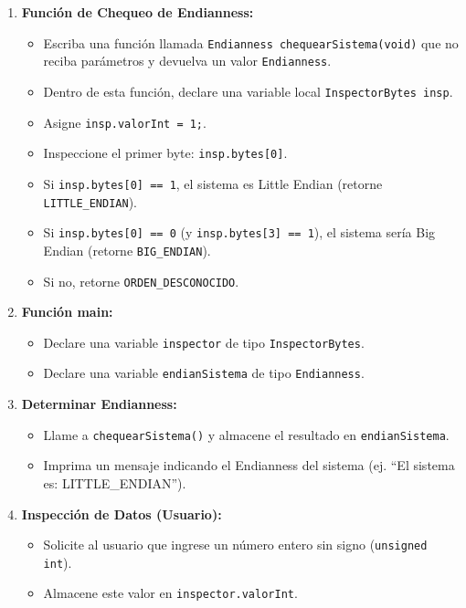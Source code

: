 \begin{enumerate}
    \item \textbf{Función de Chequeo de Endianness:}
    \begin{itemize}
        \item Escriba una función llamada \texttt{Endianness chequearSistema(void)} que no reciba parámetros y devuelva un valor \texttt{Endianness}.
        \item Dentro de esta función, declare una variable local \texttt{InspectorBytes insp}.
        \item Asigne \texttt{insp.valorInt = 1;}.
        \item Inspeccione el primer byte: \texttt{insp.bytes[0]}.
        \item Si \texttt{insp.bytes[0] == 1}, el sistema es Little Endian (retorne \texttt{LITTLE\_ENDIAN}).
        \item Si \texttt{insp.bytes[0] == 0} (y \texttt{insp.bytes[3] == 1}), el sistema sería Big Endian (retorne \texttt{BIG\_ENDIAN}).
        \item Si no, retorne \texttt{ORDEN\_DESCONOCIDO}.
    \end{itemize}

    \item \textbf{Función main:}
    \begin{itemize}
        \item Declare una variable \texttt{inspector} de tipo \texttt{InspectorBytes}.
        \item Declare una variable \texttt{endianSistema} de tipo \texttt{Endianness}.
    \end{itemize}

    \item \textbf{Determinar Endianness:}
    \begin{itemize}
        \item Llame a \texttt{chequearSistema()} y almacene el resultado en \texttt{endianSistema}.
        \item Imprima un mensaje indicando el Endianness del sistema (ej. ``El sistema es: LITTLE\_ENDIAN'').
    \end{itemize}

    \item \textbf{Inspección de Datos (Usuario):}
    \begin{itemize}
        \item Solicite al usuario que ingrese un número entero sin signo (\texttt{unsigned int}).
        \item Almacene este valor en \texttt{inspector.valorInt}.
    \end{itemize}


\end{enumerate}
